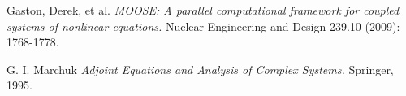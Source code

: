 \documentclass{article}
\begin{document}
\begin{thebibliography}{9}
Gaston, Derek, et al. \textit{MOOSE: A parallel computational framework for coupled systems of nonlinear equations.}
 Nuclear Engineering and Design 239.10 (2009): 1768-1778.
 
G. I. Marchuk \textit{Adjoint Equations and Analysis of Complex Systems.}
Springer, 1995.
\end{thebibliography}
\end{document}
